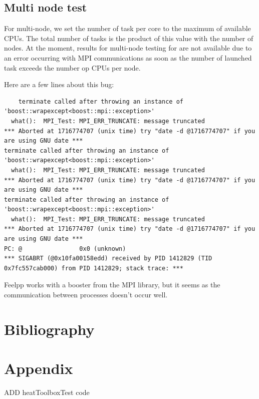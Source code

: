 \documentclass[12pt]{article}
\begin{document}
\subsection{Multi node test}
For multi-node, we set the number of task per core to the maximum of available CPUs.
The total number of tasks is the product of this value with the number of nodes.
At the moment, results for multi-node testing for are not available due to an error occurring with MPI communications as soon as the number of launched task exceeds the number op CPUs per node.

Here are a few lines about this bug:
\begin{scriptsize}
\begin{verbatim}
    terminate called after throwing an instance of 'boost::wrapexcept<boost::mpi::exception>'
  what():  MPI_Test: MPI_ERR_TRUNCATE: message truncated
*** Aborted at 1716774707 (unix time) try "date -d @1716774707" if you are using GNU date ***
terminate called after throwing an instance of 'boost::wrapexcept<boost::mpi::exception>'
  what():  MPI_Test: MPI_ERR_TRUNCATE: message truncated
*** Aborted at 1716774707 (unix time) try "date -d @1716774707" if you are using GNU date ***
terminate called after throwing an instance of 'boost::wrapexcept<boost::mpi::exception>'
  what():  MPI_Test: MPI_ERR_TRUNCATE: message truncated
*** Aborted at 1716774707 (unix time) try "date -d @1716774707" if you are using GNU date ***
PC: @                0x0 (unknown)
*** SIGABRT (@0x10fa00158edd) received by PID 1412829 (TID 0x7fc557cab000) from PID 1412829; stack trace: ***
\end{verbatim}
\end{scriptsize}

Feelpp works with a booster from the MPI library, but it seems as the communication between processes doesn't occur well.


\newpage
\section{Bibliography}
\nocite{*}
\printbibliography[heading=none]

\newpage
\section{Appendix}
ADD heatToolboxTest code
\end{document}
